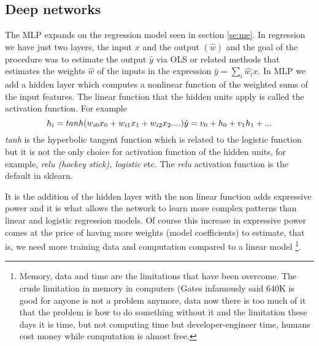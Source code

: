 \documentclass[11pt]{article}
\begin{document}
\subsection{Deep networks}
\label{se:deep}

The MLP expands on the regression model seen in section \ref{se:me}. In regression we have just two layers, the input $x$ and the output $(\hat{w})$ and the goal of the procedure was to estimate the output $\hat{y}$ via OLS or related methods that estimates the weights $\hat{w}$ of the inputs in the expression $\hat{y} = \sum_i \hat{w_i} x$. In MLP we add a hidden layer which computes a nonlinear function of the weighted sums of the input features. The linear function that the hidden units apply is called the activation function. For example
\begin{equation}
h_i = tanh(w_{i0}x_0 + w_{i1}x_1 + w_{i2}x_2 ....) \\
\hat{y} = v_0 + h_0 + v_1 h_1 + ...
\end{equation}
\textit{tanh} is the hyperbolic tangent function which is related to the logistic function but it is not the only choice for activation function of the hidden units, for example, \textit{relu (hockey stick), logistic} etc. The \textit{relu} activation function is the default in sklearn.

It is the addition of the hidden layer with the non linear function adds expressive power and it is what allows the network to learn more complex patterns than linear and logistic regression models. Of course this increase in expressive power comes at the price of having more weights (model coefficients) to estimate, that is, we need more training data and computation compared to a linear model \footnote{Memory, data and time are the limitations that have been overcome. The crude limitation in memory in computers (Gates infamously said  640K is good for anyone is not a problem anymore, data now there is too much of it that the problem is how to do something without it and the limitation these days it is time, but not computing time but developer-engineer time, humans cost money while computation is almost free.}.
\end{document}
